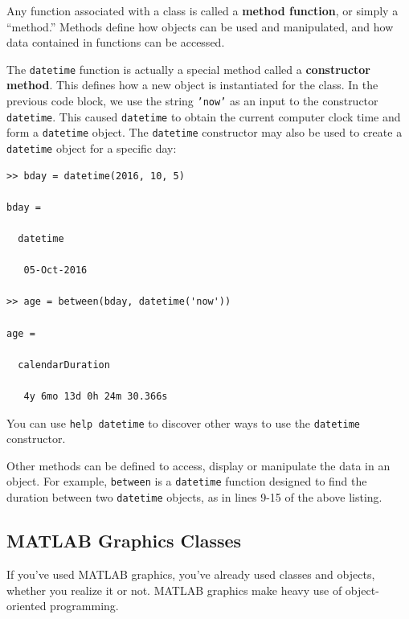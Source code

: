 Any function associated with a class is called a \textbf{method function}, or simply a ``method.'' Methods define how objects can be used and manipulated, and how data contained in functions can be accessed.

The \texttt{datetime} function is actually a special method called a \textbf{constructor method}. This defines how a new object is instantiated for the class. In the previous code block, we use the string \texttt{'now'} as an input to the constructor \texttt{datetime}. This caused \texttt{datetime} to obtain the current computer clock time and form a \texttt{datetime} object. The \texttt{datetime} constructor may also be used to create a \texttt{datetime} object for a specific day:
\begin{lstlisting}[style=Matlab-editor, caption={A \texttt{datetime} object is created to represent October 5, 2016 as a birthday.}]
>> bday = datetime(2016, 10, 5)

bday = 

  datetime

   05-Oct-2016

>> age = between(bday, datetime('now'))

age = 

  calendarDuration

   4y 6mo 13d 0h 24m 30.366s

\end{lstlisting}
 You can use \texttt{help datetime} to discover other ways to use the \texttt{datetime} constructor.

Other methods can be defined to access, display or manipulate the data in an object. For example, \texttt{between} is a \texttt{datetime} function designed to find the duration between two \texttt{datetime} objects, as in lines 9-15 of the above listing.



\subsection{MATLAB Graphics Classes}

If you've used MATLAB graphics, you've already used classes and objects, whether you realize it or not. MATLAB graphics make heavy use of object-oriented programming.

